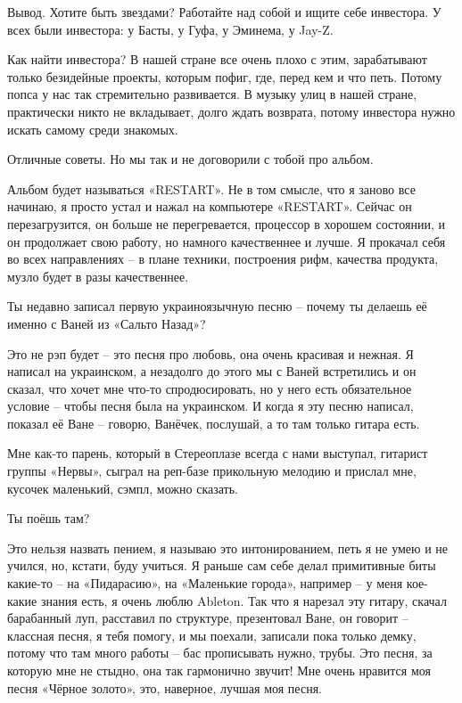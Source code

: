 Вывод. Хотите быть звездами? Работайте над собой и ищите себе инвестора. У всех
были инвестора: у Басты, у Гуфа, у Эминема, у Jay-Z.

Как найти инвестора? В нашей стране все очень плохо с этим, зарабатывают только
безидейные проекты, которым пофиг, где, перед кем и что петь. Потому попса у
нас так стремительно развивается. В музыку улиц в нашей стране, практически
никто не вкладывает, долго ждать возврата, потому инвестора нужно искать самому
среди знакомых.

Отличные советы. Но мы так и не договорили с тобой про альбом.

Альбом будет называться «RESTART». Не в том смысле, что я заново все начинаю, я
просто устал и нажал на компьютере «RESTART». Сейчас он перезагрузится, он
больше не перегревается, процессор в хорошем состоянии, и он продолжает свою
работу, но намного качественнее и лучше. Я прокачал себя во всех направлениях –
в плане техники, построения рифм, качества продукта, музло будет в разы
качественнее.

Ты недавно записал первую украиноязычную песню – почему ты делаешь её именно с
Ваней из «Сальто Назад»?

Это не рэп будет – это песня про любовь, она очень красивая и нежная. Я написал
на украинском, а незадолго до этого мы с Ваней встретились и он сказал, что
хочет мне что-то спродюсировать, но у него есть обязательное условие – чтобы
песня была на украинском. И когда я эту песню написал, показал её Ване –
говорю, Ванёчек, послушай, а то там только гитара есть.  

Мне как-то парень, который в Стереоплазе всегда с нами выступал, гитарист
группы «Нервы», сыграл на реп-базе прикольную мелодию и прислал мне, кусочек
маленький, сэмпл, можно сказать.

Ты поёшь там?

Это нельзя назвать пением, я называю это интонированием, петь я не умею и не
учился, но, кстати, буду учиться. Я раньше сам себе делал примитивные биты
какие-то – на «Пидарасию», на «Маленькие города», например – у меня кое-какие
знания есть, я очень люблю Ableton. Так что я нарезал эту гитару,  скачал
барабанный луп, расставил по структуре, презентовал Ване, он говорит – классная
песня, я тебя помогу, и мы поехали, записали пока только демку, потому что там
много работы – бас прописывать нужно, трубы. Это песня, за которую мне не
стыдно, она так гармонично звучит! Мне очень нравится моя песня «Чёрное
золото», это, наверное, лучшая моя песня.

